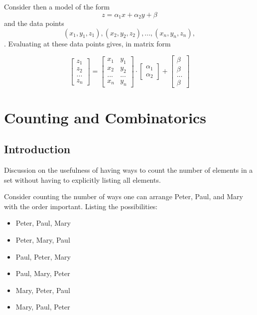 \documentclass[10pt,]{book}
\theoremstyle{plain}
\theoremstyle{definition}
\theoremstyle{definition}
\theoremstyle{definition}
\numberwithin{equation}{section}
\newcommand{\amp}{ & }
\begin{document}
Consider then a model of the form
\begin{equation*}z = \alpha_1 x + \alpha_2 y + \beta\end{equation*}
and the data points \begin{equation*}(x_1,y_1,z_1), (x_2,y_2,z_2), ... , (x_n,y_n,z_n), \end{equation*}.  Evaluating at these data points gives, in matrix form

\begin{equation*}
\begin{bmatrix}
z_1
\\ z_2
\\ ...
\\ z_n
\end{bmatrix}
=

\begin{bmatrix}
 x_1 \amp y_1 \\ 
 x_2 \amp y_2 \\ 
 ... \amp ... \\ 
 x_n \amp y_n 
\end{bmatrix} 

\cdot 

\begin{bmatrix}
\alpha_1
\\ 
\alpha_2
\end{bmatrix}
+
\begin{bmatrix}
 \beta \\ 
 \beta \\ 
 ... \\ 
 \beta 
\end{bmatrix}
\end{equation*}
%
\typeout{************************************************}
\typeout{************************************************}
\chapter[{Counting and Combinatorics}]{Counting and Combinatorics}\label{Combinatorics}
\typeout{************************************************}
\typeout{************************************************}
\section[{Introduction}]{Introduction}\label{section-15}
Discussion on the usefulness of having ways to count the number
of elements in a set without having to explicitly listing all elements.%
\par
Consider counting the number of ways one can arrange Peter, Paul, and Mary with the order important.  Listing the possibilities:
\leavevmode%
\begin{itemize}[label=\textbullet]
\item{}Peter, Paul, Mary%
\item{}Peter, Mary, Paul%
\item{}Paul, Peter, Mary%
\item{}Paul, Mary, Peter%
\item{}Mary, Peter, Paul%
\item{}Mary, Paul, Peter%
\end{itemize}
\end{document}
